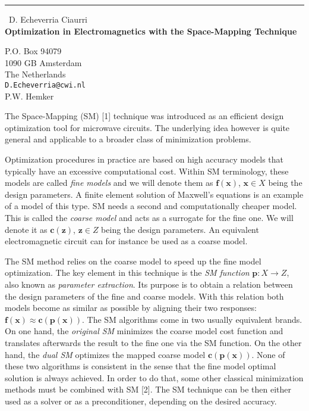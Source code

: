 \documentclass{report}
\begin{document}
\begin{center}
\rule{6in}{1pt} \
{\large D. Echeverria Ciaurri \\
{\bf Optimization in Electromagnetics with the Space-Mapping Technique}}

P.O. Box 94079 \\ 1090 GB Amsterdam \\ The Netherlands
\\
{\tt D.Echeverria@cwi.nl}\\
P.W. Hemker\end{center}

The Space-Mapping (SM) [1] technique was introduced as an efficient design optimization
tool for microwave circuits. The underlying idea however is quite general
and applicable to a broader class of minimization problems.

Optimization procedures in practice are based on high accuracy models that typically
have an excessive computational cost. Within SM terminology, these models are called
{\it fine models} and we will denote them as ${\mathbf f}({\mathbf x})$,
${\mathbf x} \in X$ being the design parameters. A finite element solution of Maxwell's
equations is an example of a model of this type. SM needs a second and computationally
cheaper model. This is called the {\it coarse model} and acts as a surrogate
for the fine one. We will denote it as ${\mathbf c}({\mathbf z})$, ${\mathbf z} \in Z$
being the design parameters. An equivalent electromagnetic circuit can for instance be
used as a coarse model.

The SM method relies on the coarse model to speed up the fine model optimization. The key
element in this technique is the {\it SM function} ${\mathbf p}:X \rightarrow Z$, also
known as {\it parameter extraction}. Its purpose is to obtain a relation
between the design
parameters of the fine and coarse models. With this relation both models become
as similar as possible by aligning their two responses:
${\mathbf f}({\mathbf x}) \approx {\mathbf c}({\mathbf p}({\mathbf x}))$.
The SM algorithms come in two usually equivalent brands. On one hand, the
{\it original SM}
minimizes the coarse model cost function and translates afterwards the result to the
fine one via the SM function. On the other hand, the {\it dual SM}
optimizes the mapped coarse
model ${\mathbf c}({\mathbf p}({\mathbf x}))$. None of these two algorithms is consistent
in the sense that the fine model optimal solution is always achieved. In
order to do that,
some other classical minimization methods must be combined with SM [2]. The SM technique
can be then either used as a solver or as a preconditioner, depending on
the desired accuracy.
\end{document}
